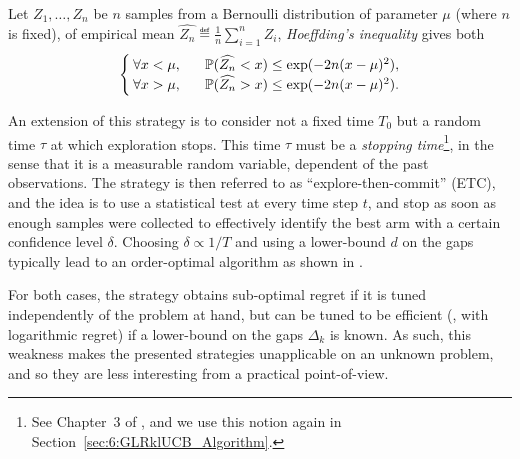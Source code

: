 \begin{lemma}\label{lem:2:HoeffdingInequality}
\begin{leftbar}[lemmabar]  %
    Let $Z_1,\dots,Z_n$ be $n$ \iid{} samples from a Bernoulli distribution of parameter $\mu$ (where $n$ is fixed),
    of empirical mean $\widehat{Z_n} \eqdef \frac{1}{n} \sum\limits_{i=1}^n Z_i$, \emph{Hoeffding's inequality} gives both
    \begin{align}\label{eq:2:HoeffdingInequality}
        \begin{cases}
            \forall x < \mu, \;\;\; & \mathbb{P}(\widehat{Z_n} < x) \leq \exp(-2 n (x-\mu)^2),
            \\
            \forall x > \mu, \;\;\; & \mathbb{P}(\widehat{Z_n} > x) \leq \exp(-2 n (x-\mu)^2).
        \end{cases}
    \end{align}
\end{leftbar}  %
\end{lemma}

An extension of this strategy is to consider not a fixed time $T_0$ but a random time $\tau$ at which exploration stops.
This time $\tau$ must be a \emph{stopping time}\footnote{See Chapter~3 of \cite{LattimoreBanditAlgorithmsBook}, and we use this notion again in Section~\ref{sec:6:GLRklUCB_Algorithm}.},
in the sense that it is a measurable random variable, dependent of the past observations. The strategy is then referred to as ``explore-then-commit'' (ETC), and the idea is to use a statistical test at every time step $t$, and stop as soon as enough samples were collected to effectively identify the best arm with a certain confidence level $\delta$.
Choosing $\delta \propto 1/T$ and using a lower-bound $d$ on the gaps typically lead to an order-optimal algorithm as shown in \cite{GarivierETC2016}.


For both cases, the strategy obtains sub-optimal regret if it is tuned independently of the problem at hand, but can be tuned to be efficient (\ie, with logarithmic regret) if a lower-bound on the gaps $\Delta_k$ is known.
As such, this weakness makes the presented strategies unapplicable on an unknown problem, and so they are less interesting from a practical point-of-view.


